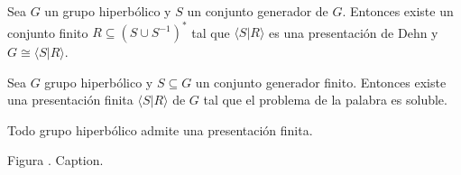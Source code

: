 \documentclass[12pt]{report}
\theoremstyle{largebreak}
\newcounter{figcount}
\newcommand{\gen}[1]{\ensuremath{\langle#1\rangle}}
\begin{document}
    \begin{theor}
        Sea $G$ un grupo hiperbólico y $S$ un conjunto generador de $G$. Entonces existe un conjunto finito $R\subseteq(S\cup S^{-1})^*$ tal que $\gen{S|R}$ es una presentación de Dehn y $G\cong\gen{S|R}$.
    \end{theor}

    \begin{cor}
        Sea $G$ grupo hiperbólico y $S\subseteq G$ un conjunto generador finito. Entonces existe una presentación finita $\gen{S|R}$ de $G$ tal que el problema de la palabra es soluble.
    \end{cor}

    \begin{cor}
        Todo grupo hiperbólico admite una presentación finita.
    \end{cor}

    \begin{minipage}{\textwidth}
    	\begin{center}
	    Figura \thefigcount. Caption.
	\end{center}
    \end{minipage}

\end{document}
